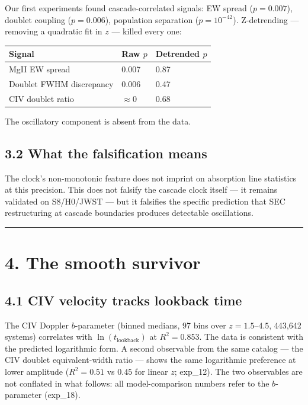 \documentclass[11pt,a4paper]{article}
\begin{document}
Our first experiments found cascade-correlated signals: EW spread ($p = 0.007$), doublet coupling ($p = 0.006$), population separation ($p = 10^{-42}$). Z-detrending — removing a quadratic fit in $z$ — killed every one:

\begin{longtable}[]{@{}lll@{}}
\toprule
Signal & Raw $p$ & Detrended $p$ \\
\midrule\endhead
MgII EW spread & 0.007 & 0.87 \\
Doublet FWHM discrepancy & 0.006 & 0.47 \\
CIV doublet ratio & $\approx 0$ & 0.68 \\
\bottomrule
\end{longtable}

The oscillatory component is absent from the data.

\subsection*{3.2 What the falsification means}

The clock's non-monotonic feature does not imprint on absorption line statistics at this precision. This does not falsify the cascade clock itself — it remains validated on S8/H0/JWST — but it falsifies the specific prediction that SEC restructuring at cascade boundaries produces detectable oscillations.

\begin{center}\rule{0.5\linewidth}{0.4pt}\end{center}

\section*{4. The smooth survivor}

\subsection*{4.1 CIV velocity tracks lookback time}

The CIV Doppler $b$-parameter (binned medians, 97 bins over $z = 1.5$–$4.5$, 443,642 systems) correlates with $\ln(t_{\text{lookback}})$ at $R^2 = 0.853$. The data is consistent with the predicted logarithmic form. A second observable from the same catalog — the CIV doublet equivalent-width ratio — shows the same logarithmic preference at lower amplitude ($R^2 = 0.51$ vs $0.45$ for linear $z$; exp\_12). The two observables are not conflated in what follows: all model-comparison numbers refer to the $b$-parameter (exp\_18).
\end{document}
